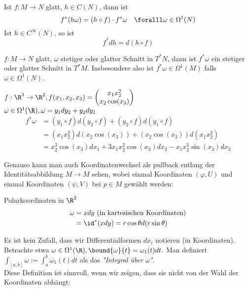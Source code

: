 \begin{prop}
	Ist $ f: M \to N $ glatt, $h \in C(N)$, dann ist
	\[ f^*(h\omega) = (h \circ f) \cdot f^*\omega\quad \foralll \omega \in \Omega^1(N) \]
	Ist $h \in C^\infty(N)$, so ist
	\[ f^*dh = d(h \circ f) \]
\end{prop}

\begin{cor*}
	$ f: M \to N $ glatt, $\omega$ stetiger oder glatter Schnitt in $T^*N$, dann ist $f^*\omega$ ein stetiger oder glatter Schnitt in $T^*M$. Insbesondere also ist $f^*\omega \in \Omega^1(M)$ falls $\omega \in \Omega^1(N)$.
\end{cor*}

\begin{exmp*}
	$ f: \R^3 \to \R^2, f(x_1,x_2,x_3) = \begin{pmatrix}
		x_1x_2^2\\ x_2 \cos(x_3)
	\end{pmatrix} $\\
	$ \omega \in \Omega^1(\R), \omega = y_1dy_2 + y_2dy_1 $
	\begin{align*}
		f^*\omega &= (y_1 \circ f)d(y_2 \circ f) + (y_2 \circ f)d(y_1 \circ f)\\
		&=(x_1x_2^2)d(x_2\cos(x_3)) + (x_2\cos(x_3))d(x_1x_2^2)\\
		&= x_2^3\cos(x_3)dx_1 + 3x_1x_2^2\cos(x_3)dx_2 - x_1x_2^3\sin(x_3)dx_3
	\end{align*}
\end{exmp*}

\begin{rem*}
	Genauso kann man auch Koordinatenwechsel als pullback entlang der Identitätsabbildung $M \to M$ sehen, wobei einmal Koordinaten $(\varphi,U)$ und einmal Koordinaten $(\psi,V)$ bei $p \in M$ gewählt werden:
\end{rem*}

\begin{exmp*}
	Polarkoordinaten in $\R^2$
	\begin{align*}		
		\omega &= xdy \ \text{(in kartesischen Koordinaten)}\\
		&= \id^*(xdy) = r\cos\theta d(r\sin\theta)
	\end{align*}
\end{exmp*}

Es ist kein Zufall, dass wir Differentialformen $dx_i$ notieren (in Koordinaten). Betrachte etwa $ \omega \in \Omega^1(\R), \bound{\omega}{t} = \omega_1(t)dt. $ Man definiert $ \int_{[a,b]}\omega := \int_a^b \omega_1(t)dt $ als das \emph{"Integral über $\omega$"}.\\
Diese Definition ist sinnvoll, wenn wir zeigen, dass sie nicht von der Wahl der Koordinaten abhängt:


